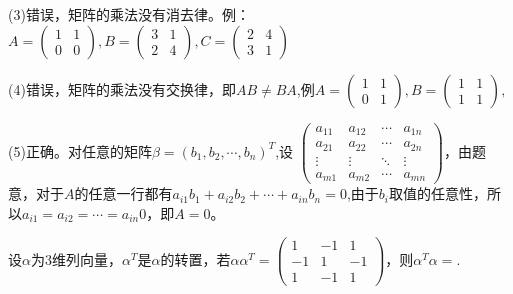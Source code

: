\documentclass[a4paper]{report}
\begin{document}
\begin{jie}
(3)错误，矩阵的乘法没有消去律。例：$A=
\begin{pmatrix}
1 &1\\ 0&0
\end{pmatrix}
,B=
\begin{pmatrix}
3 &1\\ 2&4
\end{pmatrix},C=
\begin{pmatrix}
2&4\\ 3 &1
\end{pmatrix}
$

(4)错误，矩阵的乘法没有交换律，即$AB\neq BA$,例$A=\begin{pmatrix}
1 &1\\ 0&1
\end{pmatrix}
,B=\begin{pmatrix}
1 &1\\ 1&1
\end{pmatrix}
,$

(5)正确。对任意的矩阵$\beta=(b_1,b_2,\cdots,b_{n})^{T}$,设
$
\begin{pmatrix}
a_{11}&a_{12}&\cdots&a_{1n}\\
a_{21}&a_{22}&\cdots&a_{2n}\\
\vdots&\vdots&\ddots&\vdots\\
a_{m1}&a_{m2}&\cdots&a_{mn}
\end{pmatrix}
$，由题意，对于$A$的任意一行都有$a_{i1}b_1+a_{i2}b_2+\cdots+a_{in}b_n=0$,由于$b_i$取值的任意性，所以$a_{i1} = a_{i2}=\cdots=a_{in}0$，即$A=0$。
\end{jie}

\EX 设$\alpha$为3维列向量，$\alpha^T$是$\alpha$的转置，若$\alpha\alpha^T=
\begin{pmatrix}
1&-1&1\\
-1&1&-1\\
1&-1&1
\end{pmatrix}
$，则$\alpha^T\alpha=$\underline{\hphantom{~~~~~~~~~~~~~}}.
\end{document}
